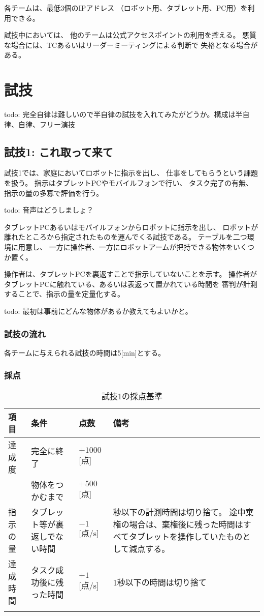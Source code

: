 \documentclass[a4j]{jarticle}
\def\thline{\noalign{\hrule height 1pt}}
\begin{document}
各チームは、最低3個のIPアドレス
（ロボット用、タブレット用、PC用）を利用できる。

試技中においては、
他のチームは公式アクセスポイントの利用を控える。
悪質な場合には、TCあるいはリーダーミーティングによる判断で
失格となる場合がある。

\section{試技}

todo: 完全自律は難しいので半自律の試技を入れてみたがどうか。構成は半自律、自律、フリー演技

\subsection{試技1: これ取って来て}

試技1では、家庭においてロボットに指示を出し、
仕事をしてもらうという課題を扱う。
指示はタブレットPCやモバイルフォンで行い、
タスク完了の有無、指示の量の多寡で評価を行う。

todo: 音声はどうしましょ？

タブレットPCあるいはモバイルフォンからロボットに指示を出し、
ロボットが離れたところから指定されたものを運んでくる試技である。
テーブルを二つ環境に用意し、
一方に操作者、一方にロボットアームが把持できる物体をいくつか置く。


操作者は、タブレットPCを裏返すことで指示していないことを示す。
操作者がタブレットPCに触れている、あるいは表返って置かれている時間を
審判が計測することで、指示の量を定量化する。

todo: 最初は事前にどんな物体があるか教えてもよいかと。

\subsubsection{試技の流れ}

各チームに与えられる試技の時間は5[min]とする。

\subsubsection{採点}

\begin{table}
\begin{center}
\caption{試技1の採点基準}
\label{table:test1score}
\begin{tabular}{l|p{5cm}|l|p{5cm}}
\thline
項目 & 条件 & 点数 & 備考\\
\hline
達成度 & 完全に終了 & $+1000$[点] \\
& 物体をつかむまで & $+500$[点] \\
\hline
指示の量 & タブレット等が裏返しでない時間& $-1$[点/s] & 秒以下の計測時間は切り捨て。
途中棄権の場合は、棄権後に残った時間はすべてタブレットを操作していたものとして減点する。\\
\hline
達成時間 & タスク成功後に残った時間 & $+1$[点/s] & 1秒以下の時間は切り捨て\\
\thline
\end{tabular}
\end{center}
\end{table}
\end{document}

